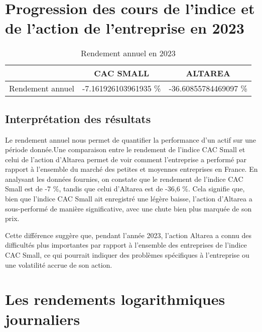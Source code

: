 \documentclass[a4paper, 12pt]{report}
\begin{document}
\section{Progression des cours de l'indice et de l'action de l'entreprise en 2023}

\begin{table}[H]
	\centering
	\begin{tabular}{@{}ccc@{}}
		\toprule
		\multicolumn{1}{c}{} & CAC SMALL & ALTAREA \\ \midrule
		Rendement annuel     & -7.161926103961935 \%             & -36.60855784469097 \%           \\ \bottomrule
	\end{tabular}
	\caption{Rendement annuel en 2023}
	\label{tab:my-table}
\end{table}
\subsection{Interprétation des résultats}
\noindent
Le rendement annuel nous permet de quantifier la performance d'un actif sur une période donnée.Une comparaison entre le rendement de l'indice CAC Small et celui de l'action d'Altarea permet de voir comment l'entreprise a performé par rapport à l'ensemble du marché des petites et moyennes entreprises en France.
\noindent
En analysant les données fournies, on constate que le rendement de l'indice CAC Small est de -7 \%, tandis que celui d'Altarea est de -36,6 \%. Cela signifie que, bien que l'indice CAC Small ait enregistré une légère baisse, l'action d'Altarea a sous-performé de manière significative, avec une chute bien plus marquée de son prix. 

Cette différence suggère que, pendant l'année 2023, l'action Altarea a connu des difficultés plus importantes par rapport à l'ensemble des entreprises de l'indice CAC Small, ce qui pourrait indiquer des problèmes spécifiques à l'entreprise ou une volatilité accrue de son action.

\section{Les rendements logarithmiques journaliers}
	
\end{document}
